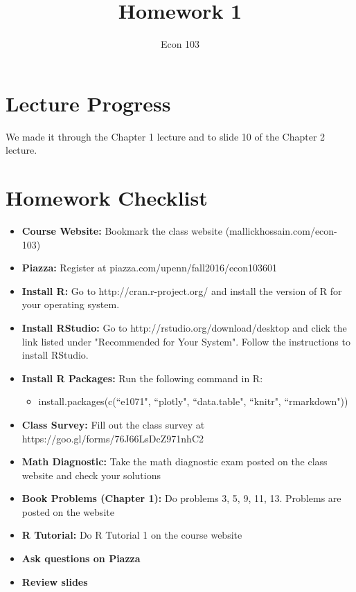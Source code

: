 \documentclass[addpoints,12pt]{exam}
\title{Homework 1}
\author{Econ 103}
\date{}
\begin{document}
\maketitle

\section*{Lecture Progress}
We made it through the Chapter 1 lecture and to slide 10 of the Chapter 2 lecture.

\section*{Homework Checklist}
\begin{itemize}[label = $\square$]
    \item \textbf{Course Website:} Bookmark the class website (mallickhossain.com/econ-103)    
    \item \textbf{Piazza:} Register at piazza.com/upenn/fall2016/econ103601
    \item \textbf{Install R:} Go to http://cran.r-project.org/ and install the version of R for your 
    operating system.
    \item \textbf{Install RStudio:} Go to http://rstudio.org/download/desktop and click the link listed 
    under "Recommended for Your System". Follow the instructions to install RStudio.
    \item \textbf{Install R Packages:} Run the following command in R: 
    \begin{itemize}
        \item install.packages(c(``e1071", ``plotly", ``data.table", ``knitr", ``rmarkdown"))
    \end{itemize}
    \item \textbf{Class Survey:} Fill out the class survey at 
    https://goo.gl/forms/76J66LsDcZ971nhC2
    \item \textbf{Math Diagnostic:} Take the math diagnostic exam posted on the class website and     
    check your solutions
    \item \textbf{Book Problems (Chapter 1):} Do problems 3, 5, 9, 11, 13. Problems are posted on the website
    \item \textbf{R Tutorial:} Do R Tutorial 1 on the course website
    \item \textbf{Ask questions on Piazza}
    \item \textbf{Review slides}
\end{itemize}
\end{document}
